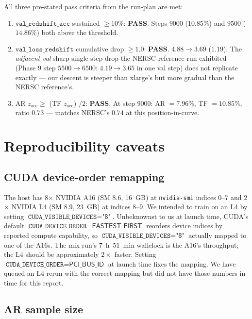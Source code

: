 \documentclass[11pt,letterpaper]{article}
\newcommand{\zacc}{\ensuremath{z_{\mathrm{acc}}}}
\newcommand{\valz}{\texttt{val\_redshift\_acc}}
\newcommand{\valzloss}{\texttt{val\_loss\_redshift}}
\begin{document}
All three pre-stated pass criteria from the run-plan are met:

\begin{enumerate}
\item $\valz$ sustained $\geq 10\%$: {\bf PASS}. Steps $9000$
      ($10.85\%$) and $9500$ ($14.86\%$) both above the threshold.
\item $\valzloss$ cumulative drop $\geq 1.0$: {\bf PASS}.
      $4.88 \to 3.69$ ($1.19$). The {\em adjacent-val} sharp
      single-step drop the NERSC reference run exhibited
      (Phase 9 step $5500 \to 6500$: $4.19 \to 3.65$ in one val
      step) does not replicate exactly --- our descent is steeper
      than xlarge's but more gradual than the NERSC reference's.
\item AR $\zacc \geq$ (TF $\zacc$) $/2$: {\bf PASS}. At step $9000$:
      AR $=7.96\%$, TF $=10.85\%$, ratio $0.73$ --- matches NERSC's
      $0.74$ at this position-in-curve.
\end{enumerate}

\section{Reproducibility caveats}

\subsection{CUDA device-order remapping}

The host has 8$\times$ NVIDIA A16 (SM 8.6, 16~GB) at \texttt{nvidia-smi}
indices $0$--$7$ and 2$\times$ NVIDIA L4 (SM 8.9, 23~GB) at indices
$8$--$9$. We intended to train on an L4 by setting
$\texttt{CUDA\_VISIBLE\_DEVICES}{=}\textsf{"8"}$. Unbeknownst to us at
launch time, CUDA's default
$\texttt{CUDA\_DEVICE\_ORDER}{=}\textsf{FASTEST\_FIRST}$ reorders
device indices by reported compute capability, so
$\texttt{CUDA\_VISIBLE\_DEVICES}{=}\textsf{"8"}$ actually mapped to one
of the A16s. The mix run's $7$~h~$51$~min wallclock is the A16's
throughput; the L4 should be approximately $2{\times}$ faster.
Setting $\texttt{CUDA\_DEVICE\_ORDER}{=}\textsf{PCI\_BUS\_ID}$ at
launch time fixes the mapping. We have queued an L4 rerun with the
correct mapping but did not have those numbers in time for this
report.

\subsection{AR sample size}
\end{document}
